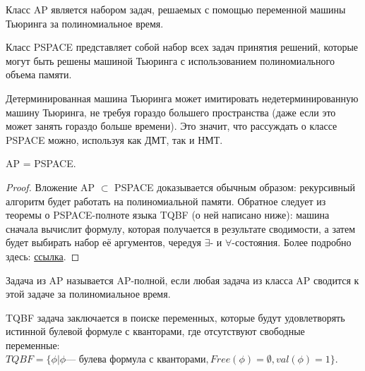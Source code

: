     \begin{Def}[Класс AP]
        Класс AP является набором задач, решаемых с помощью переменной машины Тьюринга за полиномиальное время.
    \end{Def}
    
    
    \begin{Def}
        Класс PSPACE представляет собой набор всех задач принятия решений, которые могут быть решены машиной Тьюринга с использованием полиномиального объема памяти.
    \end{Def}
    
    \begin{Rem}
        Детерминированная машина Тьюринга может имитировать недетерминированную машину Тьюринга, не требуя гораздо большего пространства (даже если это может занять гораздо больше времени). Это значит, что рассуждать о классе PSPACE можно, используя как ДМТ, так и НМТ.
    \end{Rem}
    
    \begin{Thm}
        AP = PSPACE.
    \end{Thm}
    
    \begin{proof}
        Вложение AP $\subset$ PSPACE доказывается обычным образом: рекурсивный алгоритм будет работать на полиномиальной памяти. Обратное следует из теоремы о PSPACE-полноте языка TQBF (о ней написано ниже): машина сначала вычислит формулу, которая получается в результате сводимости, а затем будет выбирать набор её аргументов, чередуя $\exists$- и $\forall$-состояния.
        Более подробно здесь: \href{http://ru.discrete-mathematics.org/fall2017/3/complexity/compl-book.pdf}{ссылка}.
    \end{proof} 

    

    \begin{Def}
        Задача из AP называется AP-полной, если любая задача из класса AP сводится к этой задаче за полиномиальное время.
    \end{Def}
    
    \begin{Def}
        TQBF задача заключается в поиске переменных, которые будут удовлетворять истинной булевой формуле с кванторами, где отсутствуют свободные переменные: $TQBF = \{\phi | \phi  \text{--- булева формула с кванторами}, Free(\phi) = \emptyset, val(\phi) = 1\}$.
    \end{Def}
    
